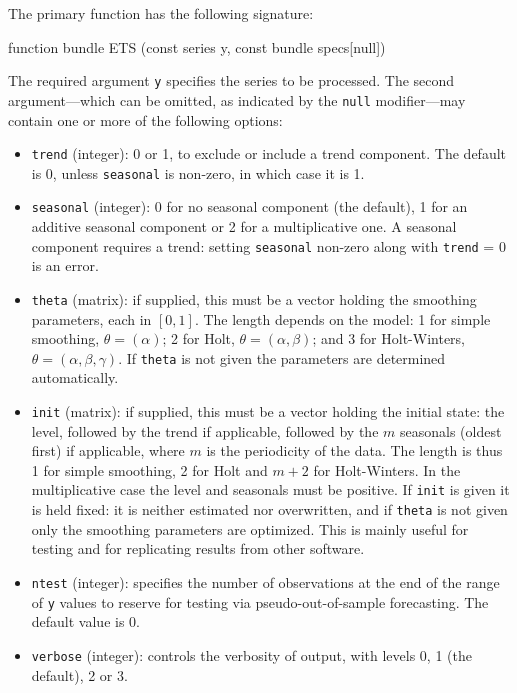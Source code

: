 \documentclass{article}
\begin{document}
The primary function has the following signature:
\begin{nscode}
function bundle ETS (const series y, const bundle specs[null])
\end{nscode}

The required argument \texttt{y} specifies the series to be processed.
The second argument---which can be omitted, as indicated by the
\texttt{null} modifier---may contain one or more of the following
options:

\begin{itemize}
\item \texttt{trend} (integer): 0 or 1, to exclude or include a trend
  component. The default is 0, unless \texttt{seasonal} is non-zero, in
  which case it is 1.
\item \texttt{seasonal} (integer): 0 for no seasonal component (the
  default), 1 for an additive seasonal component or 2 for a
  multiplicative one. A seasonal component requires a trend: setting
  \texttt{seasonal} non-zero along with \texttt{trend} = 0 is an error.
\item \texttt{theta} (matrix): if supplied, this must be a vector
  holding the smoothing parameters, each in $[0,1]$. The length depends
  on the model: 1 for simple smoothing, $\theta = (\alpha)$; 2 for Holt,
  $\theta = (\alpha, \beta)$; and 3 for Holt-Winters,
  $\theta = (\alpha, \beta, \gamma)$. If \texttt{theta} is not given the
  parameters are determined automatically.
\item \texttt{init} (matrix): if supplied, this must be a vector
  holding the initial state: the level, followed by the trend if
  applicable, followed by the $m$ seasonals (oldest first) if
  applicable, where $m$ is the periodicity of the data. The length is
  thus 1 for simple smoothing, 2 for Holt and $m+2$ for Holt-Winters.
  In the multiplicative case the level and seasonals must be positive.
  If \texttt{init} is given it is held fixed: it is neither estimated
  nor overwritten, and if \texttt{theta} is not given only the smoothing
  parameters are optimized. This is mainly useful for testing and for
  replicating results from other software.
\item \texttt{ntest} (integer): specifies the number of
  observations at the end of the range of \texttt{y} values to reserve
  for testing via pseudo-out-of-sample forecasting. The default value
  is 0.
\item \texttt{verbose} (integer): controls the verbosity of output, with
  levels 0, 1 (the default), 2 or 3.
\end{itemize}
\end{document}
